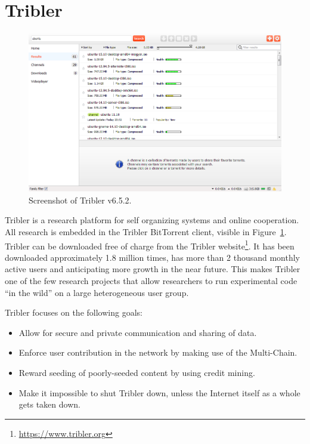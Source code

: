 \section{Tribler}

\begin{figure}
	\includegraphics[width=\linewidth]{introduction/images/tribler_screenshot.png}
	\caption{Screenshot of Tribler v6.5.2.}
	\label{fig:tribler_screenshot}
\end{figure}


Tribler is a research platform for self organizing systems and online cooperation.
All research is embedded in the Tribler BitTorrent client, visible in Figure~\ref{fig:tribler_screenshot}.
Tribler can be downloaded free of charge from the Tribler website\footnote{\url{https://www.tribler.org}}.
It has been downloaded approximately 1.8 million times, has more than 2 thousand monthly active users and anticipating more growth in the near future.
This makes Tribler one of the few research projects that allow researchers to run experimental code \enquote{in the wild} on a large heterogeneous user group.

Tribler focuses on the following goals:
\begin{itemize}
    \item Allow for secure and private communication and sharing of data.
    \item Enforce user contribution in the network by making use of the Multi-Chain.
    \item Reward seeding of poorly-seeded content by using credit mining.
    \item Make it impossible to shut Tribler down, unless the Internet itself as a whole gets taken down.
\end{itemize}

